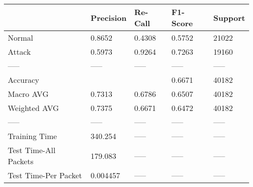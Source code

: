 \begin{tabular}{lllll}
\toprule
{} & Precision & Re-Call & F1-Score & Support \\
\midrule
Normal                &    0.8652 &  0.4308 &   0.5752 &   21022 \\
Attack                &    0.5973 &  0.9264 &   0.7263 &   19160 \\
-----                 &     ----- &   ----- &    ----- &   ----- \\
Accuracy              &           &         &   0.6671 &   40182 \\
Macro AVG             &    0.7313 &  0.6786 &   0.6507 &   40182 \\
Weighted AVG          &    0.7375 &  0.6671 &   0.6472 &   40182 \\
-----                 &     ----- &   ----- &    ----- &   ----- \\
Training Time         &   340.254 &   ----- &    ----- &   ----- \\
Test Time-All Packets &   179.083 &   ----- &    ----- &   ----- \\
Test Time-Per Packet  &  0.004457 &   ----- &    ----- &   ----- \\
\bottomrule
\end{tabular}
